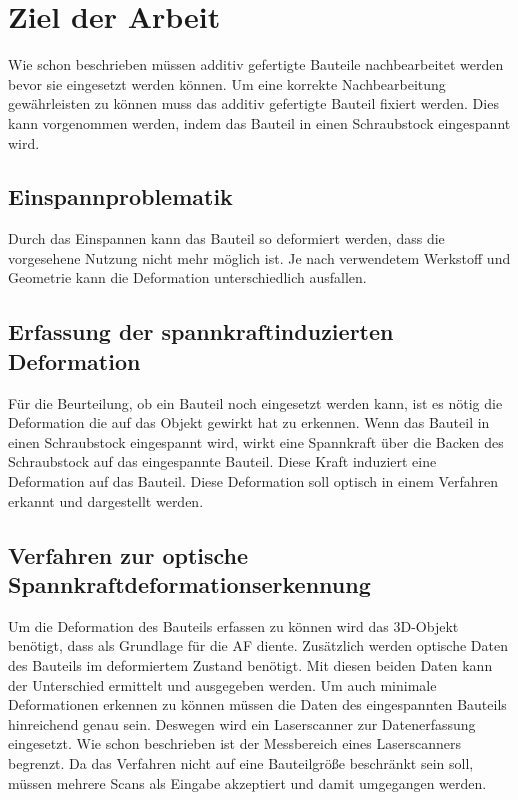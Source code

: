 

\chapter{Ziel der Arbeit}

Wie schon beschrieben müssen additiv gefertigte Bauteile nachbearbeitet werden
bevor sie eingesetzt werden können. 
Um eine korrekte Nachbearbeitung gewährleisten zu können muss das additiv 
gefertigte Bauteil fixiert werden. 
Dies kann vorgenommen werden, indem das Bauteil in einen Schraubstock eingespannt wird.

\section{Einspannproblematik}

Durch das Einspannen kann das Bauteil so deformiert werden, dass die vorgesehene Nutzung nicht mehr möglich ist. 
Je nach verwendetem Werkstoff und Geometrie kann die Deformation unterschiedlich
ausfallen. 

\section{Erfassung der spannkraftinduzierten Deformation}

Für die Beurteilung, ob ein Bauteil noch eingesetzt werden kann, ist es nötig die 
Deformation die auf das Objekt gewirkt hat zu erkennen. Wenn das Bauteil in einen 
Schraubstock eingespannt wird, wirkt eine Spannkraft über die Backen des Schraubstock
auf das eingespannte Bauteil. 
Diese Kraft induziert eine Deformation auf das Bauteil. Diese Deformation soll 
optisch in einem Verfahren erkannt und dargestellt werden.

\section{Verfahren zur optische Spannkraftdeformationserkennung}

Um die Deformation des Bauteils erfassen zu können wird das 3D-Objekt benötigt, 
dass als Grundlage für die AF diente. Zusätzlich werden optische Daten des Bauteils 
im deformiertem Zustand benötigt. Mit diesen beiden Daten kann der Unterschied 
ermittelt und ausgegeben werden.
Um auch minimale Deformationen erkennen zu können müssen die Daten des 
eingespannten Bauteils hinreichend genau sein. Deswegen wird ein Laserscanner zur 
Datenerfassung eingesetzt.
Wie schon beschrieben ist der Messbereich eines Laserscanners begrenzt. Da das 
Verfahren nicht auf eine Bauteilgröße beschränkt sein soll, müssen mehrere Scans als 
Eingabe akzeptiert und damit umgegangen werden.
